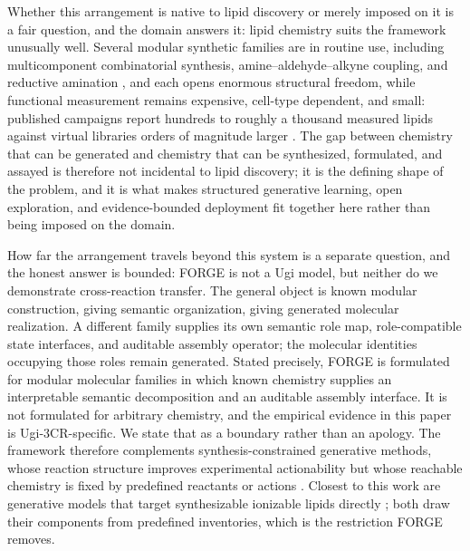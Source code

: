\documentclass{article}
\begin{document}
Whether this arrangement is native to lipid discovery or merely imposed on it is a fair question, and
the domain answers it: lipid chemistry suits the framework unusually well. Several modular synthetic families are in routine
use, including multicomponent combinatorial synthesis, amine--aldehyde--alkyne coupling, and reductive
amination \citep{akinc2008combinatorial,love2010lipidlike,li2023combinatorial}, and each opens
enormous structural freedom, while functional measurement remains expensive,
cell-type dependent, and small: published campaigns report hundreds to roughly a thousand measured
lipids against virtual libraries orders of magnitude larger \citep{li2024accelerating,xu2024agile}. The
gap between chemistry that can be generated and chemistry that can be synthesized, formulated, and
assayed is therefore not incidental to lipid discovery; it is the defining shape of the problem, and it
is what makes structured generative learning, open exploration, and evidence-bounded deployment fit
together here rather than being imposed on the domain.

How far the arrangement travels beyond this system is a separate question, and the honest answer is
bounded: FORGE is not a Ugi model, but neither do we demonstrate cross-reaction transfer. The general object is
known modular construction, giving semantic organization, giving generated molecular realization. A
different family supplies its own semantic role map, role-compatible state interfaces, and auditable
assembly operator; the molecular identities occupying those roles remain generated. Stated precisely,
FORGE is formulated for modular molecular families in which known chemistry supplies an interpretable
semantic decomposition and an auditable assembly interface. It is not formulated for arbitrary
chemistry, and the empirical evidence in this paper is Ugi-3CR-specific. We state that as a boundary
rather than an apology. The framework therefore complements synthesis-constrained generative methods,
whose reaction structure improves experimental actionability but whose reachable chemistry is fixed by
predefined reactants or actions \citep{cretu2025synflownet,koziarski2024rgfn,luo2024projecting}.
Closest to this work are generative models that target synthesizable ionizable lipids directly
\citep{ou2024deep,zhao2024generative}; both draw their components from predefined inventories, which
is the restriction FORGE removes.
\end{document}
